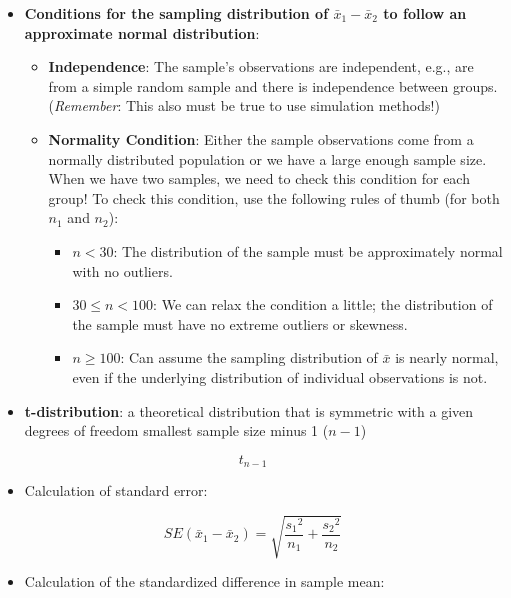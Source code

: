\documentclass[
]{report}
\providecommand{\tightlist}{%
  \setlength{\itemsep}{0pt}\setlength{\parskip}{0pt}}
\begin{document}
\begin{itemize}
\item
  \textbf{Conditions for the sampling distribution of \(\bar{x}_1 - \bar{x}_2\) to follow an approximate normal distribution}:

  \begin{itemize}
  \item
    \textbf{Independence}: The sample's observations are independent, e.g., are from a simple random sample and there is independence between groups. (\emph{Remember}: This also must be true to use simulation methods!)
  \item
    \textbf{Normality Condition}: Either the sample observations come from a normally distributed population or we have a large enough sample size. When we have two samples, we need to check this condition for each group! To check this condition, use the following rules of thumb (for both \(n_1\) and \(n_2\)):

    \begin{itemize}
    \item
      \(n < 30\): The distribution of the sample must be approximately normal with no outliers.
    \item
      \(30 \le n < 100\): We can relax the condition a little; the distribution of the sample must have no extreme outliers or skewness.
    \item
      \(n \ge 100\): Can assume the sampling distribution of \(\bar{x}\) is nearly normal, even if the underlying distribution of individual observations is not.
    \end{itemize}
  \end{itemize}
\item
  \textbf{t-distribution}: a theoretical distribution that is symmetric with a given degrees of freedom smallest sample size minus 1 (\(n-1\))
\end{itemize}

\[t_{n-1}\]

\begin{itemize}
\tightlist
\item
  Calculation of standard error:
\end{itemize}

\[SE(\bar{x}_1 - \bar{x}_2) = \sqrt{\frac{{s_1}^2}{n_1}+\frac{{s_2}^2}{n_2}}\]

\begin{itemize}
\tightlist
\item
  Calculation of the standardized difference in sample mean:
\end{itemize}
\end{document}
